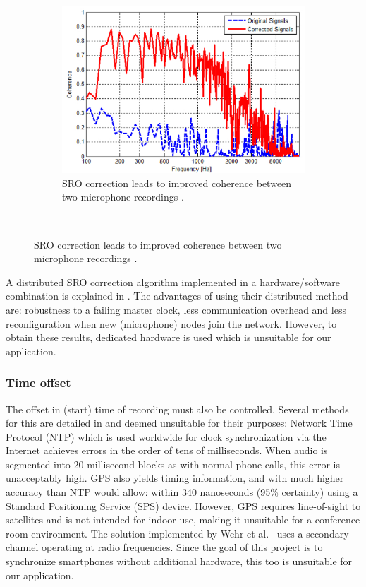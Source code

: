 \begin{figure}[b!]
\begin{subfigure}[b]{0.27\textwidth}
                \includegraphics[width=\textwidth]{images/sro_coherence}
                \caption{SRO correction leads to improved coherence between two microphone recordings \cite{cherkassky2014blind}.}
                \label{fig:sro_coherence}
        \end{subfigure}
~
\end{figure}

A distributed SRO correction algorithm implemented in a hardware/software combination is explained in \cite{Schmalenstroeer2015}. The advantages of using their distributed method are: robustness to a failing master clock, less communication overhead and less reconfiguration when new (microphone) nodes join the network. However, to obtain these results, dedicated hardware is used which is unsuitable for our application.

\subsubsection{Time offset}
The offset in (start) time of recording must also be controlled. Several methods for this are detailed in \cite{wehr2004} and deemed unsuitable for their purposes: Network Time Protocol (NTP) which is used worldwide for clock synchronization via the Internet achieves errors in the order of tens of milliseconds. When audio is segmented into 20 millisecond blocks as with normal phone calls, this error is unacceptably high. GPS also yields timing information, and with much higher accuracy than NTP would allow: within 340 nanoseconds (95\% certainty) using a Standard Positioning Service (SPS) device. However, GPS requires line-of-sight to satellites and is not intended for indoor use, making it unsuitable for a conference room environment. The solution implemented by Wehr et al.\ \cite{wehr2004} uses a secondary channel operating at radio frequencies. Since the goal of this project is to synchronize smartphones without additional hardware, this too is unsuitable for our application.

